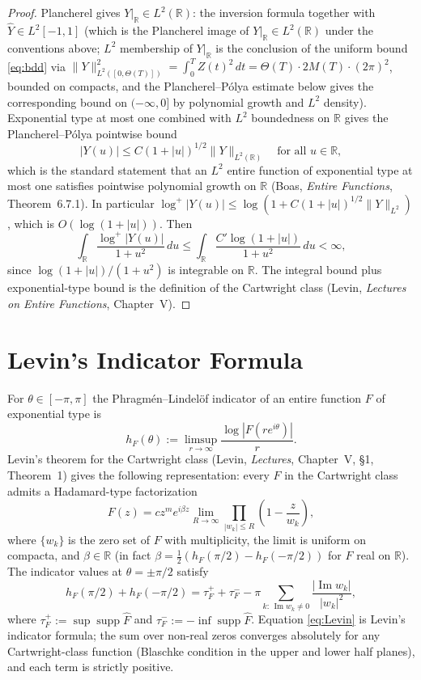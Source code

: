 \documentclass[11pt,a4paper]{article}
\theoremstyle{plain}
\theoremstyle{definition}
\newcommand{\R}{\mathbb{R}}
\DeclareMathOperator{\supp}{supp}
\DeclareMathOperator{\Imag}{Im}
\begin{document}
\begin{proof}
Plancherel gives $Y|_\R\in L^2(\R)$: the inversion formula together with $\hat Y\in L^2[-1,1]$ (which is the Plancherel image of $Y|_\R\in L^2(\R)$ under the conventions above; $L^2$ membership of $Y|_\R$ is the conclusion of the uniform bound \eqref{eq:bdd} via $\|Y\|_{L^2([0,\Theta(T)])}^2=\int_0^T Z(t)^2\,dt=\Theta(T)\cdot 2M(T)\cdot(2\pi)^2$, bounded on compacts, and the Plancherel--P\'olya estimate below gives the corresponding bound on $(-\infty,0]$ by polynomial growth and $L^2$ density). Exponential type at most one combined with $L^2$ boundedness on $\R$ gives the Plancherel--P\'olya pointwise bound
\[
|Y(u)|\le C(1+|u|)^{1/2}\|Y\|_{L^2(\R)}\quad\text{for all }u\in\R,
\]
which is the standard statement that an $L^2$ entire function of exponential type at most one satisfies pointwise polynomial growth on $\R$ (Boas, \emph{Entire Functions}, Theorem~6.7.1). In particular $\log^+|Y(u)|\le\log(1+C(1+|u|)^{1/2}\|Y\|_{L^2})$, which is $O(\log(1+|u|))$. Then
\[
\int_\R\frac{\log^+|Y(u)|}{1+u^2}\,du\le\int_\R\frac{C'\log(1+|u|)}{1+u^2}\,du<\infty,
\]
since $\log(1+|u|)/(1+u^2)$ is integrable on $\R$. The integral bound plus exponential-type bound is the definition of the Cartwright class (Levin, \emph{Lectures on Entire Functions}, Chapter~V).
\end{proof}

\section{Levin's Indicator Formula}

For $\theta\in[-\pi,\pi]$ the Phragm\'en--Lindel\"of indicator of an entire function $F$ of exponential type is
\[
h_F(\theta):=\limsup_{r\to\infty}\frac{\log|F(re^{i\theta})|}{r}.
\]
Levin's theorem for the Cartwright class (Levin, \emph{Lectures}, Chapter~V, \S1, Theorem~1) gives the following representation: every $F$ in the Cartwright class admits a Hadamard-type factorization
\[
F(z)=cz^m e^{i\beta z}\lim_{R\to\infty}\prod_{|w_k|\le R}\!\!\left(1-\frac{z}{w_k}\right),
\]
where $\{w_k\}$ is the zero set of $F$ with multiplicity, the limit is uniform on compacta, and $\beta\in\R$ (in fact $\beta=\tfrac12(h_F(\pi/2)-h_F(-\pi/2))$ for $F$ real on $\R$). The indicator values at $\theta=\pm\pi/2$ satisfy
\begin{equation}\label{eq:Levin}
h_F(\pi/2)+h_F(-\pi/2)=\tau_F^++\tau_F^--\pi\!\!\sum_{k:\,\Imag w_k\neq 0}\!\!\frac{|\Imag w_k|}{|w_k|^2},
\end{equation}
where $\tau_F^+:=\sup\supp\hat F$ and $\tau_F^-:=-\inf\supp\hat F$. Equation \eqref{eq:Levin} is Levin's indicator formula; the sum over non-real zeros converges absolutely for any Cartwright-class function (Blaschke condition in the upper and lower half planes), and each term is strictly positive.
\end{document}
